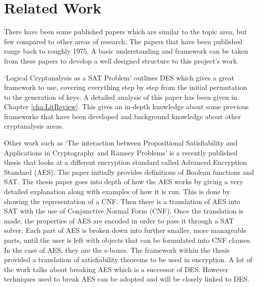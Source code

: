 \documentclass[11pt,a4paper, notitlepage]{report}
\begin{document}
\section{Related Work}
\label{cha:RWork}

There have been some published papers which are similar to the topic area, but few compared to other areas of research. The papers that have been published range back to roughly 1975. A basic understanding and framework can be taken from these papers to develop a well designed structure to this project's work. 

`Logical Cryptanalysis as a SAT Problem' \cite{Fabio2000LogicalSAT} outlines DES which gives a great framework to use, covering everything step by step from the initial permutation to the generation of keys. A detailed analysis of this paper has been given in Chapter \ref{cha:LitReview}. This gives an in-depth knowledge about some previous frameworks that have been developed and background knowledge about other cryptanalysis areas. 

Other work such as `The interaction between Propositional Satisfiability and Applications in Cryptography and Ramsey Problems' \cite{Gwynne2010Interaction} is a recently published thesis that looks at a different encryption standard called Advanced Encryption Standard (AES). The paper initially provides definitions of Boolean functions and SAT. The thesis paper goes into depth of how the AES works by giving a very detailed explanation along with examples of how it is run. This is done by showing the representation of a CNF. Then there is a translation of AES into SAT with the use of Conjunctive Normal Form (CNF). Once the translation is made, the properties of AES are encoded in order to pass it through a SAT solver. Each part of AES is broken down into further smaller, more manageable parts, until the user is left with objects that can be formulated into CNF clauses. In the case of AES, they are the s-boxes. 
The framework within the thesis provided a translation of satisfiability theorems to be used in encryption. A lot of the work talks about breaking AES which is a successor of DES. However techniques used to break AES can be adopted and will be closely linked to DES.
\end{document}
